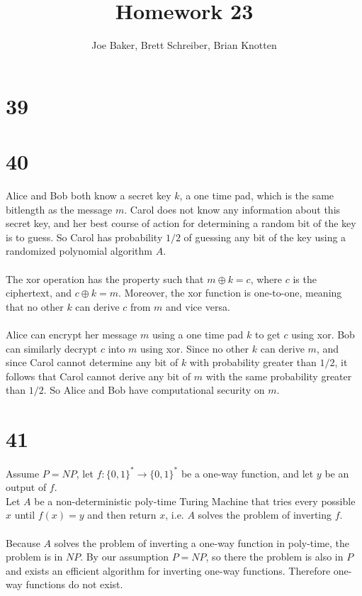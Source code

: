 \documentclass[letterpaper,notitlepage,twoside]{article}
\begin{document}
\title{Homework 23}
\author{Joe Baker, Brett Schreiber, Brian Knotten}
\maketitle

\section*{39}

\section*{40}
Alice and Bob both know a secret key $k$, a one time pad, which is the same bitlength as the message $m$.
Carol does not know any information about this secret key, and her best course of action for determining a random bit of the key is to guess.
So Carol has probability $1/2$ of guessing any bit of the key using a randomized polynomial algorithm $A$. \\\\
The xor operation has the property such that $m \oplus k = c$, where $c$ is the ciphertext, and $c \oplus k = m$. Moreover, the xor function is one-to-one, meaning that no other $k$ can derive $c$ from $m$ and vice versa. \\\\
Alice can encrypt her message $m$ using a one time pad $k$ to get $c$ using xor. Bob can similarly decrypt $c$ into $m$ using xor.
Since no other $k$ can derive $m$, and since Carol cannot determine any bit of $k$ with probability greater than $1/2$, it follows that Carol cannot derive any bit of $m$ with the same probability greater than $1/2$.
So Alice and Bob have computational security on $m$.

\section*{41}
Assume $P=NP$, let $f:\{0,1\}^{*} \rightarrow \{0,1\}^{*}$ be a one-way function, and let $y$ be an output of $f$. \\
Let $A$ be a non-deterministic poly-time Turing Machine that tries every possible $x$ until $f(x) = y$ and then return $x$, i.e. $A$ solves the problem of inverting $f$. \\ \\
Because $A$ solves the problem of inverting a one-way function in poly-time, the problem is in $NP$.
By our assumption $P=NP$, so there the problem is also in $P$ and exists an efficient algorithm for inverting one-way functions.
Therefore one-way functions do not exist.
\end{document}
